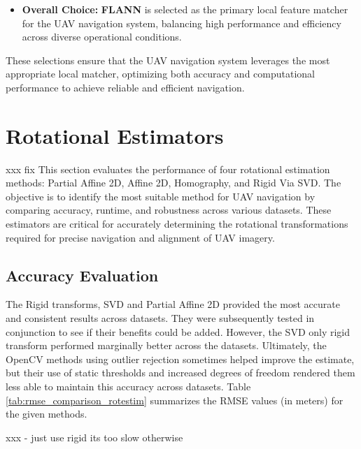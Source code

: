 \begin{itemize}
    \item \textbf{Overall Choice:} \textbf{FLANN} is selected as the primary local feature matcher for the UAV navigation system, balancing high performance and efficiency across diverse operational conditions.
\end{itemize}

These selections ensure that the UAV navigation system leverages the most appropriate local matcher, optimizing both accuracy and computational performance to achieve reliable and efficient navigation.


\section{Rotational Estimators}
xxx fix
This section evaluates the performance of four rotational estimation methods: Partial Affine 2D, Affine 2D, Homography, and Rigid Via SVD. The objective is to identify the most suitable method for UAV navigation by comparing accuracy, runtime, and robustness across various datasets. These estimators are critical for accurately determining the rotational transformations required for precise navigation and alignment of UAV imagery.

\subsection{Accuracy Evaluation}

The Rigid transforms, SVD and Partial Affine 2D provided the most accurate and consistent results across datasets. They were subsequently tested in conjunction to see if their benefits could be added. However, the SVD only rigid transform performed marginally better across the datasets. Ultimately, the OpenCV methods using outlier rejection sometimes helped improve the estimate, but their use of static thresholds and increased degrees of freedom rendered them less able to maintain this accuracy across datasets. Table \ref{tab:rmse_comparison_rotestim} summarizes the RMSE values (in meters) for the given methods.

xxx - just use rigid its too slow otherwise 

